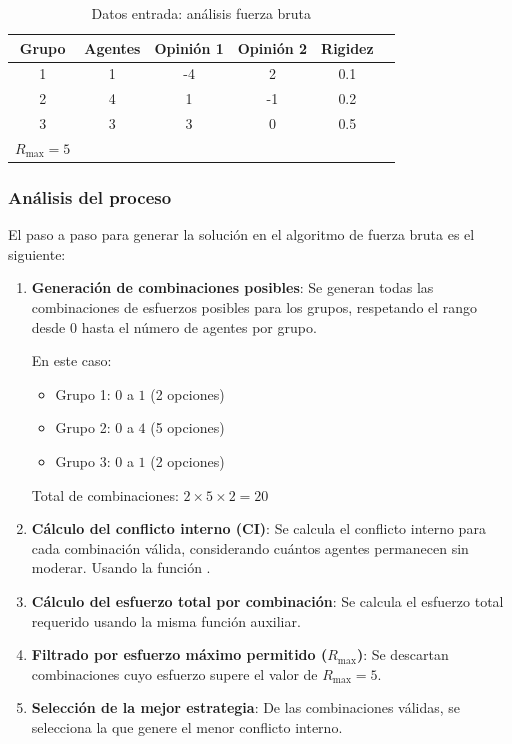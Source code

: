 \documentclass[11pt,letter]{article}
\begin{document}
    \begin{table}[ht]
        \centering
        \begin{tabular}{cccccc}
            \toprule
            \textbf{Grupo} & \textbf{Agentes} & \textbf{Opinión 1} & \textbf{Opinión 2} & \textbf{Rigidez} \\
            \midrule
            1              & 1                & -4                 & 2                  & 0.1              \\
            2              & 4                & 1                  & -1                 & 0.2              \\
            3              & 3                & 3                  & 0                  & 0.5              \\
            \bottomrule
            $R_{\text{max}} = 5$
        \end{tabular}
        \caption{Datos entrada: análisis fuerza bruta}
    \end{table}


    \subsubsection*{Análisis del proceso}
    El paso a paso para generar la solución en el algoritmo de fuerza bruta es el siguiente:
    \begin{enumerate}
        \item \textbf{Generación de combinaciones posibles}: Se generan todas las combinaciones de esfuerzos posibles para los grupos, respetando el rango desde 0 hasta el número de agentes por grupo.

        En este caso:
        \begin{itemize}
            \item Grupo 1: $0$ a $1$ (2 opciones)
            \item Grupo 2: $0$ a $4$ (5 opciones)
            \item Grupo 3: $0$ a $1$ (2 opciones)
        \end{itemize}

        Total de combinaciones: $2 \times 5 \times 2 = 20$

        \item \textbf{Cálculo del conflicto interno (CI)}: Se calcula el conflicto interno para cada combinación válida, considerando cuántos agentes permanecen sin moderar. Usando la función .
        \item \textbf{Cálculo del esfuerzo total por combinación}: Se calcula el esfuerzo total requerido usando la misma función auxiliar.

        \item \textbf{Filtrado por esfuerzo máximo permitido ($R_{\text{max}}$)}: Se descartan combinaciones cuyo esfuerzo supere el valor de $R_{\text{max}} = 5$.

        \item \textbf{Selección de la mejor estrategia}: De las combinaciones válidas, se selecciona la que genere el menor conflicto interno.
    \end{enumerate}
\end{document}
